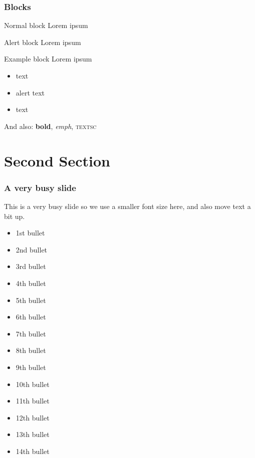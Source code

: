 \documentclass[t,10pt,aspectratio=169]{beamer}
\begin{document}
\begin{frame}
   \frametitle{Blocks}

   \begin{block}{Normal block}
      Lorem ipsum
   \end{block}

   \begin{alertblock}{Alert block}
      Lorem ipsum
   \end{alertblock}

   \begin{exampleblock}{Example block}
      Lorem ipsum
   \end{exampleblock}

   \begin{itemize}
      \item {} text
      \item \alert{alert} text
      \item {} text
   \end{itemize}

   And also: \textbf{bold}, \emph{emph}, \textsc{textsc}

\end{frame}

\section{Second Section}

\begin{frame}
   \frametitle{A very busy slide}

   {
   \fontsize{8pt}{10}\selectfont

   \vspace{-2ex}

   This is a very busy slide so we use a smaller font size here, and also move text a bit up.

   \begin{itemize}
    \item 1st bullet
    \item 2nd bullet
    \item 3rd bullet
    \item 4th bullet
    \item 5th bullet
    \item 6th bullet
    \item 7th bullet
    \item 8th bullet
    \item 9th bullet
    \item 10th bullet
    \item 11th  bullet
    \item 12th bullet
    \item 13th bullet
    \item 14th bullet
   \end{itemize}

   }
\end{frame}
\end{document}
